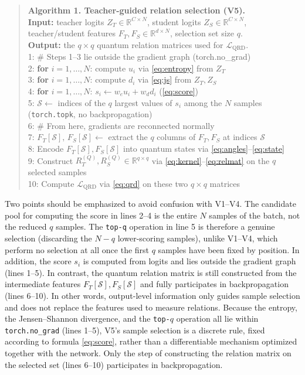 \begin{quote}
\ttfamily\small
\noindent\textbf{Algorithm 1. Teacher-guided relation selection (V5).}\\[2pt]
\textbf{Input:} teacher logits $Z_T \in \mathbb{R}^{C \times N}$,
student logits $Z_S \in \mathbb{R}^{C \times N}$, teacher/student
features $F_T, F_S \in \mathbb{R}^{d \times N}$, selection set size
$q$.\\
\textbf{Output:} the $q \times q$ quantum relation matrices used for
$\mathcal{L}_{\mathrm{QRD}}$.\\[4pt]
1: \quad \# Steps 1--3 lie outside the gradient graph (torch.no\_grad)\\
2: \quad \textbf{for} $i = 1,\ldots,N$: compute $u_i$ via
\eqref{eq:entropy} from $Z_T$\\
3: \quad \textbf{for} $i = 1,\ldots,N$: compute $d_i$ via
\eqref{eq:js} from $Z_T, Z_S$\\
4: \quad \textbf{for} $i = 1,\ldots,N$: $s_i \leftarrow w_e u_i + w_d d_i$
(\eqref{eq:score})\\
5: \quad $\mathcal{S} \leftarrow$ indices of the $q$ largest values
of $s_i$ among the $N$ samples (\texttt{torch.topk}, no
backpropagation)\\[4pt]
6: \quad \# From here, gradients are reconnected normally\\
7: \quad $F_T[\mathcal{S}],\, F_S[\mathcal{S}] \leftarrow$ extract
the $q$ columns of $F_T, F_S$ at indices $\mathcal{S}$\\
8: \quad Encode $F_T[\mathcal{S}], F_S[\mathcal{S}]$ into quantum
states via \eqref{eq:angles}--\eqref{eq:state}\\
9: \quad Construct $R_T^{(Q)}, R_S^{(Q)} \in \mathbb{R}^{q \times q}$
via \eqref{eq:kernel}--\eqref{eq:relmat} on the $q$ selected samples\\
10: \quad Compute $\mathcal{L}_{\mathrm{QRD}}$ via \eqref{eq:qrd} on
these two $q \times q$ matrices
\end{quote}

Two points should be emphasized to avoid confusion with V1--V4. The
candidate pool for computing the score in lines 2--4 is the entire
$N$ samples of the batch, not the reduced $q$ samples. The
\texttt{top-q} operation in line 5 is therefore a genuine selection
(discarding the $N - q$ lower-scoring samples), unlike V1--V4, which
perform no selection at all once the first $q$ samples have been
fixed by position. In addition, the score $s_i$ is computed from
logits and lies outside the gradient graph (lines 1--5). In
contrast, the quantum relation matrix is still constructed from the
intermediate features $F_T[\mathcal{S}], F_S[\mathcal{S}]$ and fully
participates in backpropagation (lines 6--10). In other words,
output-level information only guides sample selection and does not
replace the features used to measure relations. Because the entropy,
the Jensen--Shannon divergence, and the \texttt{top-}$q$ operation
all lie within \texttt{torch.no\_grad} (lines 1--5), V5's sample
selection is a discrete rule, fixed according to formula
\eqref{eq:score}, rather than a differentiable mechanism optimized
together with the network. Only the step of constructing the
relation matrix on the selected set (lines 6--10) participates in
backpropagation.

